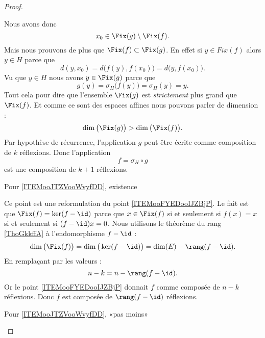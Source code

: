 \begin{proof}
\begin{subproof}
    Nous avons donc
    \begin{equation}
        x_0\in\Fix(g)\setminus\Fix(f).
    \end{equation}
    Mais nous prouvons de plus que \( \Fix(f)\subset\Fix(g)\). En effet si \( y\in Fix(f)\) alors \( y\in H\) parce que
    \begin{equation}
        d(y,x_0)=d\big( f(y),f(x_0) \big)=d\big( y, f(x_0) \big).
    \end{equation}
    Vu que \( y\in H\) nous avons \( y\in \Fix(g)\) parce que
    \begin{equation}
        g(y)=\sigma_H\big( f(y) \big)=\sigma_H(y)=y.
    \end{equation}
    Tout cela pour dire que l'ensemble \( \Fix(g)\) est \emph{strictement} plus grand que \( \Fix(f)\). Et comme ce sont des espaces affines nous pouvons parler de dimension :
    \begin{equation}
        \dim\big( \Fix(g) \big)>\dim\big( \Fix(f) \big).
    \end{equation}
    Par hypothèse de récurrence, l'application \(  g\) peut être écrite comme composition de \( k\) réflexions. Donc l'application
    \begin{equation}
        f=\sigma_H\circ g
    \end{equation}
    est une composition de \( k+1\) réflexions.
        \item[Pour \ref{ITEMooJTZVooWvyfDD}, existence]

            Ce point est une reformulation du point \ref{ITEMooFYEDooIJZBjP}. Le fait est que \( \Fix(f)=\ker(f-\id)\) parce que \( x\in\Fix(f)\) si et seulement si \( f(x)=x\) si et seulement si \( (f-\id)x=0\). Nous utilisons le théorème du rang \ref{ThoGkkffA} à l'endomorphisme \( f-\id\) :
            \begin{equation}
                \dim\big( \Fix(f) \big)=\dim\big( \ker(f-\id) \big)=\dim(E)-\rang(f-\id).
            \end{equation}
            En remplaçant par les valeurs :
            \begin{equation}
                n-k=n-\rang(f-\id).
            \end{equation}
            Or le point \ref{ITEMooFYEDooIJZBjP} donnait \( f\) comme composée de \( n-k\) réflexions. Donc \( f\) est composée de \( \rang(f-\id)\) réflexions.
        \item[Pour \ref{ITEMooJTZVooWvyfDD}, «pas moins»]


\end{subproof}
\end{proof}
